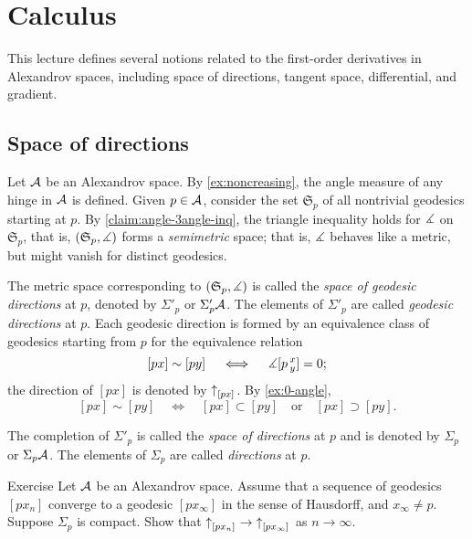 
\chapter{Calculus}\label{chap:derivative}

This lecture defines several notions related to the first-order derivatives in Alexandrov spaces, including space of directions, tangent space, differential, and gradient.

\section{Space of directions} 
\label{sec:space+directions}

Let $\mathcal{A}$ be an Alexandrov space.
By \ref{ex:noncreasing}, the angle measure of any hinge in $\mathcal{A}$ is defined.
Given $p\in \mathcal{A}$, consider the set $\mathfrak{S}_p$ of all nontrivial geodesics starting at $p$.
By \ref{claim:angle-3angle-inq}, the triangle inequality holds for $\measuredangle$ on $\mathfrak{S}_p$,
that is, $(\mathfrak{S}_p,\measuredangle)$ 
forms a \emph{semimetric} space;
that is, $\measuredangle$ behaves like a metric, but might vanish for distinct geodesics.

The metric space corresponding to  $(\mathfrak{S}_p,\measuredangle)$ is called the \emph{space of geodesic directions} at $p$, denoted by $\Sigma'_p$ or $\Sigma'_p\mathcal{A}$.
The elements of $\Sigma'_p$ are called \emph{geodesic directions} at $p$.
Each geodesic direction is formed by an equivalence class of geodesics starting from $p$ 
for the equivalence relation 
\[[px]\sim[py]\quad \iff\quad \measuredangle[p\,{}^{x}_{y}]=0;\]
the direction of $[px]$ is denoted by ${\uparrow}_{[{p}{x}]_{{}}} $.
By \ref{ex:0-angle}, 
\[[px]\sim[py]
\quad\iff\quad
[px]\subset [py]
\quad\text{or}\quad
[px]\supset[py].
\]
 
The completion of $\Sigma'_p$ is called the \emph{space of directions} at $p$ and is denoted by $\Sigma_p$ or $\Sigma_p\mathcal{A}$.
The elements of $\Sigma_p$ are called \emph{directions} at $p$.

\begin{thm}{Exercise}\label{ex:dir-compact}
Let $\mathcal{A}$ be an Alexandrov space.
Assume that a sequence of geodesics $[px_n]$ converge to a geodesic $[px_\infty]$ in the sense of Hausdorff,
and $x_\infty\ne p$.
Suppose $\Sigma_p$ is compact.
Show that ${\uparrow}_{[{p}{x_n}]_{{}}}\to{\uparrow}_{[{p}{x_\infty}]_{{}}}$ as $n\to\infty$.

\end{thm}


